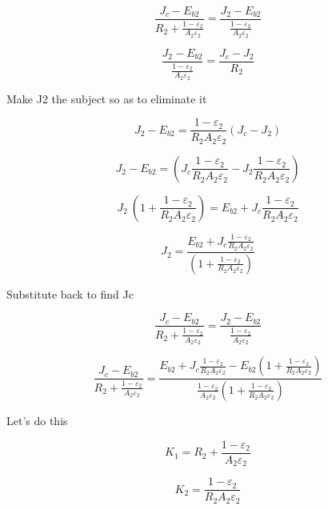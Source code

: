 \documentclass[12pt]{article}
\renewcommand{\_}{\kern-1.5pt\textunderscore\kern-1.5pt}
\begin{document}
 \[ \frac{J_{c}-E_{b2}}{R_{2}+\frac{1- \varepsilon _{2}}{A_{2} \varepsilon _{2}}}=\frac{J_{2}-E_{b2}}{\frac{1- \varepsilon _{2}}{A_{2} \varepsilon _{2}}} \] \par

 \[ \frac{J_{2}-E_{b2}}{\frac{1- \varepsilon _{2}}{A_{2} \varepsilon _{2}}}=\frac{J_{c}-J_{2}}{R_{2}} \] \par

Make J2 the subject so as to eliminate it\par

 \[ J_{2}-E_{b2}=\frac{1- \varepsilon _{2}}{R_{2}A_{2} \varepsilon _{2}} \left( J_{c}-J_{2} \right)  \] \par

 \[ J_{2}-E_{b2}= \left( J_{c}\frac{1- \varepsilon _{2}}{R_{2}A_{2} \varepsilon _{2}}-J_{2}\frac{1- \varepsilon _{2}}{R_{2}A_{2} \varepsilon _{2}} \right)  \] \par

 \[ J_{2}~ \left( 1+\frac{1- \varepsilon _{2}}{R_{2}A_{2} \varepsilon _{2}} \right) =E_{b2}+J_{c}\frac{1- \varepsilon _{2}}{R_{2}A_{2} \varepsilon _{2}} \] \par

 \[ J_{2}=\frac{E_{b2}+J_{c}\frac{1- \varepsilon _{2}}{R_{2}A_{2} \varepsilon _{2}}}{ \left( 1+\frac{1- \varepsilon _{2}}{R_{2}A_{2} \varepsilon _{2}} \right) } \] \par

Substitute back to find Jc\par

 \[ \frac{J_{c}-E_{b2}}{R_{2}+\frac{1- \varepsilon _{2}}{A_{2} \varepsilon _{2}}}=\frac{J_{2}-E_{b2}}{\frac{1- \varepsilon _{2}}{A_{2} \varepsilon _{2}}} \] \par

 \[ \frac{J_{c}-E_{b2}}{R_{2}+\frac{1- \varepsilon _{2}}{A_{2} \varepsilon _{2}}}=\frac{E_{b2}+J_{c}\frac{1- \varepsilon _{2}}{R_{2}A_{2} \varepsilon _{2}}-E_{b2} \left( 1+\frac{1- \varepsilon _{2}}{R_{2}A_{2} \varepsilon _{2}} \right) }{\frac{1- \varepsilon _{2}}{A_{2} \varepsilon _{2}} \left( 1+\frac{1- \varepsilon _{2}}{R_{2}A_{2} \varepsilon _{2}} \right) } \] \par

Let’s do this\par

 \[ K_{1}=R_{2}+\frac{1- \varepsilon _{2}}{A_{2} \varepsilon _{2}} \] \par

 \[ K_{2}=\frac{1- \varepsilon _{2}}{R_{2}A_{2} \varepsilon _{2}} \] \par
\end{document}

